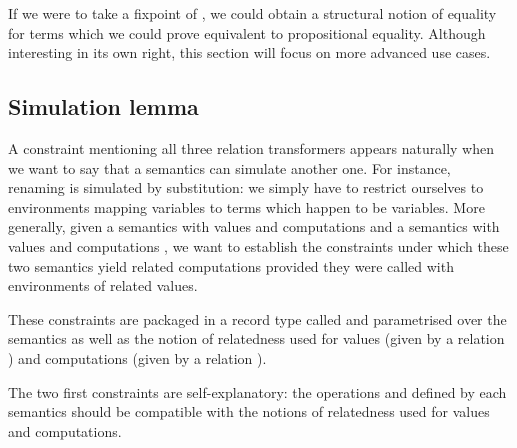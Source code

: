 \begin{agdasnippet}
\end{agdasnippet}

If we were to take a fixpoint of , we could obtain a structural
notion of equality for terms which we could prove equivalent to propositional
equality. Although interesting in its own right, this section will focus
on more advanced use cases.



\subsection{Simulation lemma}\label{section:simulation}

A constraint mentioning all three relation transformers appears naturally when
we want to say that a semantics can simulate another one. For instance, renaming
is simulated by substitution: we simply have to restrict ourselves to environments
mapping variables to terms which happen to be variables.
More generally, given a semantics  with values  and computations
 and a semantics  with values  and computations ,
we want to establish the constraints under which these two semantics yield
related computations provided they were called with environments of related values.

These constraints are packaged in a record type called  and
parametrised over the semantics as well as the notion of relatedness used
for values (given by a relation ) and computations
(given by a relation ).

\begin{agdasnippet}
\end{agdasnippet}

The two first constraints are self-explanatory: the operations
 and  defined by each semantics
should be compatible with the notions of relatedness used for values and computations.

\begin{agdasnippet}
\addtolength{\leftskip}{\parindent}
\end{agdasnippet}

